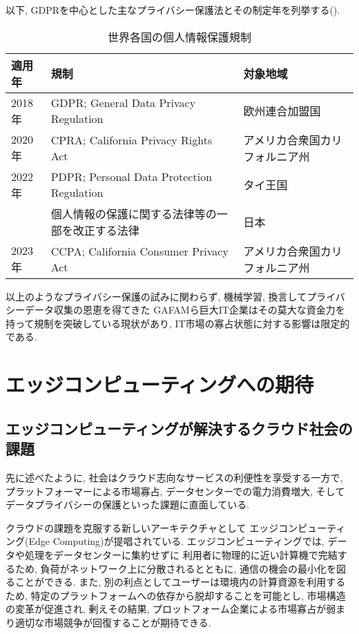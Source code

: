 以下, GDPRを中心とした主なプライバシー保護法とその制定年を列挙する(). 
\begin{table}[H]
  \centering
  \caption{世界各国の個人情報保護規制}
  \label{tab:個人情報保護}
  \begin{tabular}{lll}
    \toprule
    適用年&規制&対象地域\\ \midrule
    2018年&GDPR; General Data Privacy Regulation&欧州連合加盟国\\
    2020年&CPRA; California Privacy Rights Act&アメリカ合衆国カリフォルニア州\\
    2022年&PDPR; Personal Data Protection Regulation&タイ王国\\
          &個人情報の保護に関する法律等の一部を改正する法律&日本\\
    2023年&CCPA; California Consumer Privacy Act&アメリカ合衆国カリフォルニア州\\
    \bottomrule
  \end{tabular}
\end{table}
以上のようなプライバシー保護の試みに関わらず,  
機械学習, 換言してプライバシーデータ収集の恩恵を得てきた
GAFAMら巨大IT企業はその莫大な資金力を持って規制を突破している現状があり\cite{GDPRの影響}, 
IT市場の寡占状態に対する影響は限定的である.
\clearpage
\section{エッジコンピューティングへの期待}
\subsection*{エッジコンピューティングが解決するクラウド社会の課題}
先に述べたように, 社会はクラウド志向なサービスの利便性を享受する一方で, 
プラットフォーマーによる市場寡占, データセンターでの電力消費増大, 
そしてデータプライバシーの保護といった課題に直面している.

クラウドの課題を克服する新しいアーキテクチャとして
エッジコンピューティング(Edge Computing)が提唱されている.
エッジコンピューティングでは, 
データや処理をデータセンターに集約せずに
利用者に物理的に近い計算機で完結するため, 
負荷がネットワーク上に分散されるとともに, 通信の機会の最小化を図ることができる.
また, 別の利点としてユーザーは環境内の計算資源を利用するため, 
特定のプラットフォームへの依存から脱却することを可能とし, 
市場構造の変革が促進され, 剰えその結果, 
プロットフォーム企業による市場寡占が弱まり適切な市場競争が回復することが期待できる.
